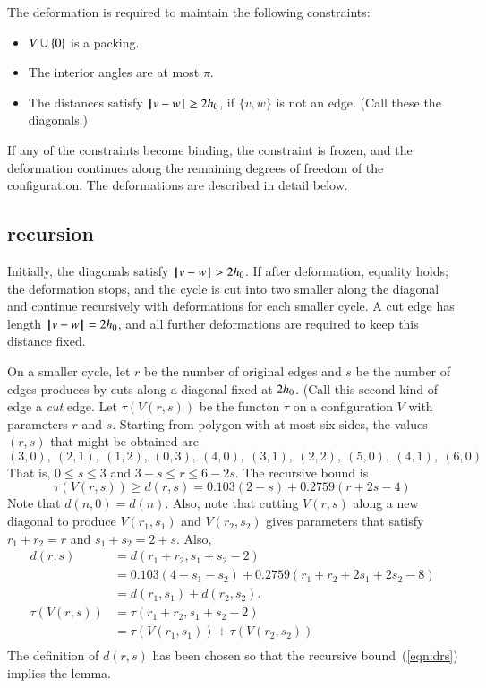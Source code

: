 {The deformation is required to maintain the following
constraints:
\begin{itemize}
\item $V\cup\{0\}$ is a packing.
\item The interior angles are at most $\pi$.
\item The distances satisfy ${\hskip0.1em|\hskip-0.15em|\hskip0.1em}v - w{\hskip0.1em|\hskip-0.15em|\hskip0.1em}\ge 2{h_0}$, if $\{v,w\}$ is
not an edge.  (Call these the diagonals.)
\end{itemize}
If any of the constraints become binding, the
constraint is frozen, and the deformation continues along the remaining degrees of freedom of the configuration.  The deformations are described in detail below.

\subsection{recursion}

Initially, the diagonals satisfy ${\hskip0.1em|\hskip-0.15em|\hskip0.1em}v - w{\hskip0.1em|\hskip-0.15em|\hskip0.1em}>2{h_0}$.
If after deformation, equality holds;  the deformation stops, and the cycle is cut into two smaller along the diagonal
and continue recursively with deformations for each smaller cycle.  A cut edge has length ${\hskip0.1em|\hskip-0.15em|\hskip0.1em}v - w{\hskip0.1em|\hskip-0.15em|\hskip0.1em}=2{h_0}$, and
 all further deformations are required to keep this distance fixed.  

On a smaller cycle, let $r$ be the number of original edges and $s$ be the number of edges produces by cuts along a diagonal fixed at $2{h_0}$.  (Call this second kind of edge a {\it cut} edge.  Let $\tau(V(r,s))$ be the functon $\tau$ on a configuration $V$ with parameters $r$ and $s$.  Starting from polygon with at most six sides, the values $(r,s)$ that might be obtained are
$$
(3,0),~(2,1),~(1,2),~(0,3),~
(4,0),~(3,1),~(2,2),~
(5,0),~(4,1),~
(6,0)
$$
That is, $0\le s\le 3$ and $3-s\le r\le 6-2s$.
The recursive bound is
\begin{equation}\label{eqn:drs}
\tau(V(r,s)) \ge d(r,s) = 0.103 (2-s) + 0.2759 (r+2s-4) 
\end{equation}
Note that $d(n,0) = d(n)$. Also, note that cutting
$V(r,s)$ along a new diagonal to produce $V(r_1,s_1)$
and $V(r_2,s_2)$ gives parameters that satisfy $r_1+r_2=r$ and $s_1+s_2 = 2+s$.
Also,
\begin{equation}\label{eqn:drs-add}
\begin{array}{lll}
d(r,s) &= d(r_1+r_2,s_1+s_2-2) \\
  &=0.103 (4-s_1-s_2) + 0.2759 (r_1+r_2+2s_1+2s_2-8) \\
  &=d(r_1,s_1) + d(r_2,s_2).\\
\tau(V(r,s)) &= \tau(r_1+r_2,s_1+s_2-2)\\
  &=\tau(V(r_1,s_1)) +\tau(V(r_2,s_2))\\
\end{array}
\end{equation}
The definition of $d(r,s)$ has been
chosen so that the recursive 
bound~(\ref{eqn:drs}) implies the
lemma.

}
